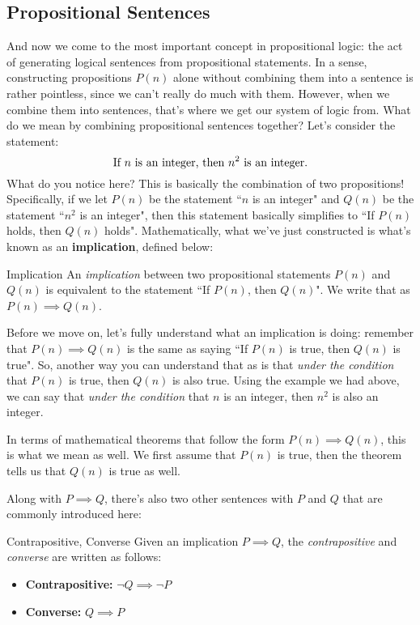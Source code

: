 \subsection{Propositional Sentences}
And now we come to the most important concept in propositional logic: the act of generating logical sentences from 
propositional statements. In a sense, constructing propositions \( P(n) \) alone without combining them into a sentence 
is rather pointless, since we can't really do much with them. However, when we combine them into sentences, 
that's where we get our system of logic from. 
What do we mean by combining propositional sentences together? Let's consider the statement: 
\[
	\text{If \( n \) is an integer, then \( n^2 \) is an integer.}
\] 
What do you notice here? This is basically the combination of two propositions! Specifically, if we let 
\( P(n) \) be the statement ``\( n \) is an integer" and \( Q(n) \) be the statement ``\( n^2 \) is an integer", then 
this statement basically simplifies to ``If  \( P(n) \) holds, then \( Q(n) \) holds". Mathematically, what 
we've just constructed is what's known as an \textbf{implication}, defined below:
\begin{definition}{Implication}{}
	An \textit{implication} between two propositional statements \( P(n) \) and \( Q(n) \) is equivalent to 
	the statement ``If  \( P(n) \), then \( Q(n) \)". We write that as \( P(n) \implies Q(n) \). 
\end{definition}
Before we move on, let's fully understand what an implication is doing: remember that \( P(n) \implies 
Q(n)\) is the same as saying ``If \( P(n) \) is true, then \( Q(n) \) is true". So, another way you can understand 
that as is that \textit{under the condition} that \( P(n) \) is true, then \( Q(n) \) is also true. Using the example
we had above, we can say that \textit{under the condition} that \( n \) is an integer, then \( n^2 \) is also 
an integer. 
\begin{remark}{}{}
	In terms of mathematical theorems that follow the form \( P(n) \implies Q(n) \), this is what we mean as well. We 
	first assume that \( P(n) \) is true, then the theorem tells us that \( Q(n) \) is true as well.  
\end{remark}
Along with \( P \implies Q \), there's also two other sentences with \( P \) and \( Q \) that are commonly 
introduced here:
\begin{definition}{Contrapositive, Converse}{}
	Given an implication \( P \implies Q \), the 
	\textit{contrapositive} and \textit{converse} are written as 
	follows:
	\begin{itemize}
		\item \textbf{Contrapositive:} \( \neg Q \implies \neg P \)
		\item \textbf{Converse:} \( Q \implies P \)
	\end{itemize}
\end{definition}	
